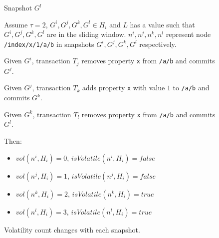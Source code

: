 \documentclass[abstracton,12pt]{scrreprt}
\begin{document}
\begin{figure}
\begin{scriptsize}
\begin{multicols}{4}
\begin{center}
{                    \vspace{27mm}
                }

                Snapshot $G^l$
            \end{center}
        \end{multicols}
    \end{scriptsize}
    Assume $\tau = 2$, $G^i,G^j,G^k,G^l \in H_i$ and $L$ has a value such that $G^i,G^j,G^k,G^l$ are in the sliding window.
    $n^i, n^j, n^k, n^l$ represent node \texttt{/index/x/1/a/b} in snapshots $G^i, G^j, G^k, G^l$ respectively.
    
    Given $G^i$, transaction $T_j$ removes property \texttt{x} from \texttt{/a/b} and commits $G^j$.
    
    Given $G^j$, transaction $T_k$ adds property \texttt{x} with value $1$ to \texttt{/a/b} and commits $G^k$.
    
    Given $G^k$, transaction $T_l$ removes property \texttt{x} from \texttt{/a/b} and commits $G^l$.
    
    Then:
    \begin{itemize}
        \item $vol(n^i, H_i) = 0$, \quad $isVolatile(n^i, H_i) = false$
        \item $vol(n^j, H_i) = 1$, \quad $isVolatile(n^j, H_i) = false$
        \item $vol(n^k, H_i) = 2$, \quad $isVolatile(n^k, H_i) = true$
        \item $vol(n^l, H_i) = 3$, \quad $isVolatile(n^l, H_i) = true$
    \end{itemize}    
    \caption{Volatility count changes with each snapshot.}
    \label{fig:vol_example}
\end{figure}


\end{document}
